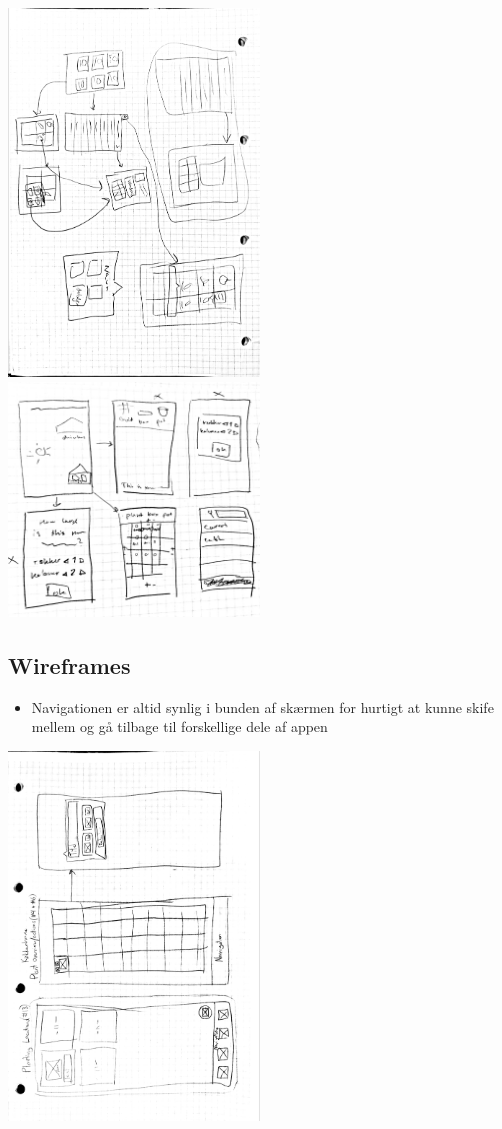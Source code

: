 \includegraphics[width=0.5\textwidth]{img/s1-7.jpg}\\
\includegraphics[width=0.5\textwidth]{img/s1-9.jpg}\\

\subsection{Wireframes}

\begin{itemize}
    \item Navigationen er altid synlig i bunden af skærmen for hurtigt at kunne skife mellem og gå tilbage til forskellige dele af appen
\end{itemize}

\includegraphics[width=0.5\textwidth]{img/s1-4.jpg}\\


